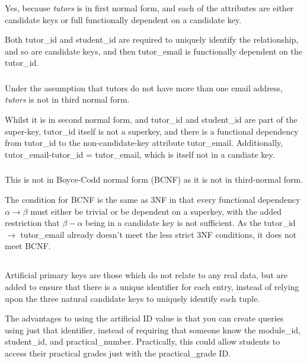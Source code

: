 \documentclass[11pt]{article}
\begin{document}
    Yes, because \textit{tutors} is in first normal form, and each of the
    attributes are either candidate keys or full functionally dependent on a
    candidate key.

    Both tutor\_id and student\_id are required to uniquely identify the
    relationship, and so are candidate keys, and then tutor\_email is
    functionally dependent on the tutor\_id.

    \subsubsection{}

    Under the assumption that tutors do not have more than one email address,
    \textit{tutors} is not in third normal form. 

    Whilst it is in second normal form, and tutor\_id and student\_id are part
    of the super-key, tutor\_id itself is not a superkey, and there is a
    functional dependency from tutor\_id to the non-candidate-key attribute
    tutor\_email. Additionally, tutor\_email-tutor\_id = tutor\_email, which is
    itself not in a candiate key.

    \subsubsection{}

    This is not in Boyce-Codd normal form (BCNF) as it is not in third-normal
    form.

    The condition for BCNF is the same as 3NF in that every functional
    dependency $\alpha \rightarrow \beta$ must either be trivial or be
    dependent on a superkey, with the added restriction that $\beta - \alpha$
    being in a candidate key is not sufficient. As the tutor\_id $\rightarrow$
    tutor\_email already doesn't meet the less strict 3NF conditions, it does
    not meet BCNF.

    \subsection{}

    Artificial primary keys are those which do not relate to any real data, but
    are added to ensure that there is a unique identifier for each entry,
    instead of relying upon the three natural candidate keys to uniquely
    identify each tuple.

    The advantages to using the artificial ID value is that you can create
    queries using just that identifier, instead of requiring that someone know
    the module\_id, student\_id, and practical\_number. Practically, this could
    allow students to access their practical grades just with the
    practical\_grade ID.
\end{document}
